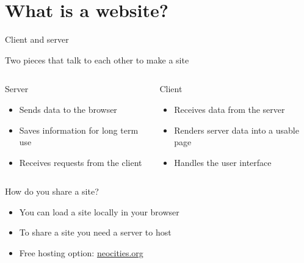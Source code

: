 \documentclass{beamer}
\begin{document}
\section{What is a website?}
\begin{frame}{Client and server}
  \begin{block}{}
    Two pieces that talk to each other to make a site
  \end{block}
  \begin{columns}
    \begin{column}{0.4\columnwidth}
      \begin{block}{Server}
        \begin{itemize}
          \item<1-> \textcolor<2>{RedOrange}{Sends data to the browser}
          \item<1,3-> \textcolor<3>{RedOrange}{Saves information for long term use}
          \item<1,4-> \textcolor<4>{RedOrange}{Receives requests from the client}
        \end{itemize}
      \end{block}
    \end{column}

    \begin{column}{0.4\columnwidth}
      \begin{block}{Client}
        \begin{itemize}
          \item<1,5-> \textcolor<5>{RedOrange}{Receives data from the server}
          \item<1,6-> \textcolor<6>{RedOrange}{Renders server data into a usable page}
          \item<1,7-> \textcolor<7>{RedOrange}{Handles the user interface}
        \end{itemize}
      \end{block}
    \end{column}
  \end{columns}
\end{frame}

\begin{frame}{How do you share a site?}
  \begin{block}{}
    \begin{itemize}
      \item<1-> You can load a site locally in your browser
      \item<2-> To share a site you need a server to \alert{host}
      \item<3-> Free hosting option: \url{neocities.org}
    \end{itemize}
  \end{block}
\end{frame}
\end{document}
